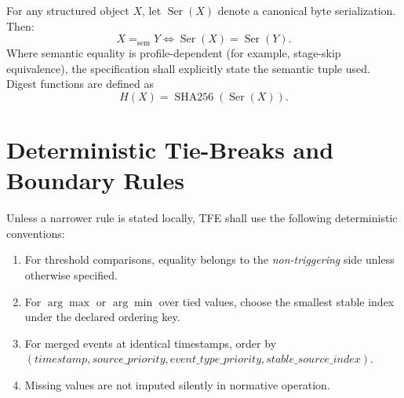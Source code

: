 For any structured object $X$, let $\operatorname{Ser}(X)$ denote a canonical byte serialization. Then:
\[
X =_{\mathrm{sem}} Y \iff \operatorname{Ser}(X)=\operatorname{Ser}(Y).
\]
Where semantic equality is profile-dependent (for example, stage-skip equivalence), the specification shall explicitly state the semantic tuple used. Digest functions are defined as
\[
H(X)=\operatorname{SHA256}(\operatorname{Ser}(X)).
\]

\section{Deterministic Tie-Breaks and Boundary Rules}

Unless a narrower rule is stated locally, TFE shall use the following deterministic conventions:
\begin{enumerate}[leftmargin=1.2cm]
\item For threshold comparisons, equality belongs to the \emph{non-triggering} side unless otherwise specified.
\item For $\arg\max$ or $\arg\min$ over tied values, choose the smallest stable index under the declared ordering key.
\item For merged events at identical timestamps, order by $(timestamp, source\_priority, event\_type\_priority, stable\_source\_index)$.
\item Missing values are not imputed silently in normative operation.
\end{enumerate}
